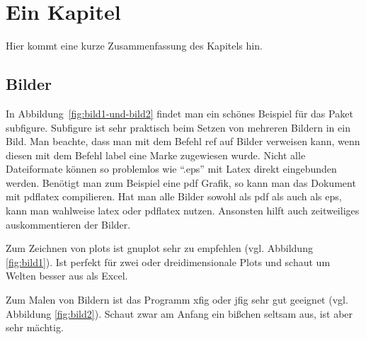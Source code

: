 \chapter{Ein Kapitel}
\label{cha:grafiken}
Hier kommt eine kurze Zusammenfassung des Kapitels hin. 

\section{Bilder}
\label{sec:bilder}

In Abbildung~\ref{fig:bild1-und-bild2} findet man ein  sch{\"o}nes Beispiel f{\"u}r das  Paket subfigure. Subfigure ist sehr praktisch beim Setzen von mehreren Bildern in ein Bild. Man beachte, dass man mit dem Befehl ref auf Bilder verweisen kann, wenn diesen mit dem Befehl label eine Marke zugewiesen wurde. Nicht alle Dateiformate können so problemlos wie ``.eps'' mit Latex direkt eingebunden werden. Benötigt man zum Beispiel eine pdf Grafik, so kann man das Dokument mit pdflatex compilieren. Hat man alle Bilder sowohl als pdf als auch als eps, kann man wahlweise latex oder pdflatex nutzen. Ansonsten hilft auch zeitweiliges auskommentieren der Bilder.


Zum Zeichnen von plots ist gnuplot sehr zu empfehlen (vgl. Abbildung \ref{fig:bild1}). Ist perfekt f{\"u}r zwei oder dreidimensionale Plots und schaut um Welten besser aus als Excel.

Zum Malen von Bildern ist das Programm xfig oder jfig sehr gut geeignet (vgl. Abbildung \ref{fig:bild2}). Schaut zwar am Anfang ein bi{\ss}chen seltsam aus, ist aber sehr m{\"a}chtig.

